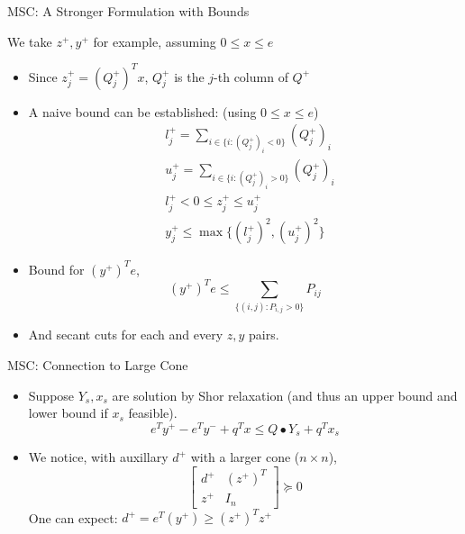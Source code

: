 \begin{frame}{MSC: A Stronger Formulation with Bounds}

  We take \(z^+, y^+\) for example, assuming \(0\le x\le e\)
  \begin{itemize}
    \item Since \(z^+_j = (Q^+_j)^T x\), \(Q^+_j\) is the \(j\)-th column of \(Q^+\)
    \item A naive bound can be established: (using \(0 \le x \le e\))
          \[\begin{aligned}
               & l^+_j = \sum_{i\in\{i: (Q^+_j)_i < 0\}} (Q^+_j)_i \\
               & u^+_j = \sum_{i\in\{i: (Q^+_j)_i > 0\}} (Q^+_j)_i \\
               & l^+_j < 0 \le z^+_j \le  u^+_j                    \\
               & y^+_j \le \max \{(l^+_j)^2, (u^+_j)^2\}
            \end{aligned}
          \]
    \item Bound for \((y^+)^T e\),
          \[(y^+)^T e \le \sum_{\{(i,j): P_{i,j} > 0 \}} P_{ij} \]
    \item And secant cuts for each and every \(z, y\) pairs.
  \end{itemize}

\end{frame}

\begin{frame}{MSC: Connection to Large Cone}
  \begin{itemize}
    \item Suppose \(Y_s, x_s\) are solution by Shor relaxation (and thus an upper bound and lower bound if \(x_s\) feasible).
          \[e^Ty^+ - e^Ty^- +  q^Tx \le Q\bullet Y_s  + q^T x_s\]
    \item We notice, with auxillary \(d^+\) with a larger cone (\(n \times n\)),
          \[\begin{bmatrix}d^+ & (z^+)^T\\ z^+ & I_n \end{bmatrix} \succeq 0\]
          One can expect: \(d^+ = e^T(y^+)\ge (z^+)^Tz^+\)
  \end{itemize}

\end{frame}

